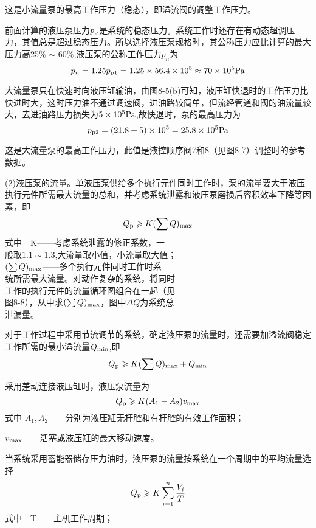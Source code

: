 这是小流量泵的最高工作压力（稳态），即溢流阀的调整工作压力。

前面计算的液压泵压力$p_{\rm p}$是系统的稳态压力。系统工作时还存在有动态超调压力，其值总是超过稳态压力。所以选择液压泵规格时，其公称压力应比计算的最大压力高25$\%$ $\sim$ 60$\%$,液压泵的公称工作压力$p_n$为
$$ p_n=1.25p_{\rm p1}=1.25\times56.4\times10^5\approx70\times10^5{\rm Pa} $$

大流量泵只在快速时向液压缸输油，由图8-5(b)可知，液压缸快退时的工作压力比快进时大，这时压力油不通过调速阀，进油路较简单，但流经管道和阀的油流量较大，去进油路压力损失为$5\times10^5{\rm Pa}$,故快退时，泵的最高压力为
$$ p_{\rm p2}=(21.8+5)\times10^5=25.8\times10^5{\rm Pa} $$

这是大流量泵的最高工作压力，此值是液控顺序阀7和8（见图8-7）调整时的参考数据。

(2)液压泵的流量。单液压泵供给多个执行元件同时工作时，泵的流量要大于液压执行元件所需最大流量的总和，并考虑系统泄露和液压泵磨损后容积效率下降等因素，即
\begin{equation}
    Q_{\rm p}\geqslant K(\sum Q)_{\rm max}
\end{equation}
式中$\quad$K——考虑系统泄露的修正系数，一\\般取$1.1\sim1.3$,大流量取小值，小流量取大值；\\$(\sum Q)_{\rm max}$——多个执行元件同时工作时系\\统所需最大流量。对动作复杂的系统，将同时\\工作的执行元件的流量循环图组合在一起（见\\图8-8），从中求$(\sum Q)_{\rm max}$，图中$\Delta Q$为系统总\\泄漏量。

对于工作过程中采用节流调节的系统，确定液压泵的流量时，还需要加溢流阀稳定工作所需的最小溢流量$Q_{\rm min}$,即
\begin{equation}
    Q_{\rm p}\geqslant K(\sum Q)_{\rm max}+Q_{\rm min}
\end{equation}

采用差动连接液压缸时，液压泵流量为
\begin{equation}
    Q_{\rm p}\geqslant K(A_1 -A_2)v_{\rm max}
\end{equation}
式中 $A_1,A_2$——分别为液压缸无杆腔和有杆腔的有效工作面积；

    $v_{\rm max}$——活塞或液压缸的最大移动速度。
  
当系统采用蓄能器储存压力油时，液压泵的流量按系统在一个周期中的平均流量选择
\begin{equation}
    Q_{\rm p}\geqslant K\sum_{i = 1}^{n} \frac{V_i}{T}
\end{equation}
式中$\quad$T——主机工作周期；

